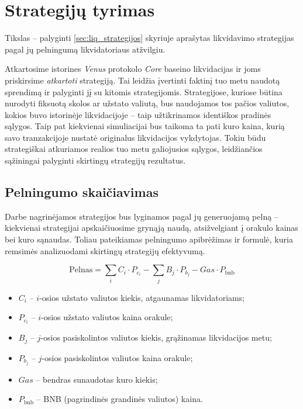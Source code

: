 \documentclass[]{VUMIFTemplateClass}
\begin{document}
\section{Strategijų tyrimas}
Tikslas – palyginti \ref{sec:liq_strategijos} skyriuje aprašytas likvidavimo strategijas pagal jų pelningumą likvidatoriaus atžvilgiu.

Atkartosime istorines \textit{Venus} protokolo \textit{Core} baseino likvidacijas ir joms priskirsime \textit{atkartoti} strategiją. Tai leidžia įvertinti faktinį tuo metu naudotą sprendimą ir palyginti jį su kitomis strategijomis. Strategijose, kuriose būtina nurodyti fiksuotą skolos ar užstato valiutą, bus naudojamos tos pačios valiutos, kokios buvo istorinėje likvidacijoje – taip užtikrinamos identiškos pradinės sąlygos. Taip pat kiekvienai simuliacijai bus taikoma ta pati kuro kaina, kurią savo tranzakcijoje nustatė originalus likvidacijos vykdytojas. Tokiu būdu strategiškai atkuriamos realios tuo metu galiojusios sąlygos, leidžiančios sąžiningai palyginti skirtingų strategijų rezultatus.

\subsection{Pelningumo skaičiavimas}
\label{sec:pelningumo_skaiciavimas}

Darbe nagrinėjamos strategijos bus lyginamos pagal jų generuojamą pelną – kiekvienai strategijai apskaičiuosime grynąją naudą, atsižvelgiant į orakulo kainas bei kuro sąnaudas. Toliau pateikiamas pelningumo apibrėžimas ir formulė, kuria remsimės analizuodami skirtingų strategijų efektyvumą.

\[
\text{Pelnas} = \sum_{i} C_i \cdot P_{c_i} - \sum_{j} B_j \cdot P_{b_j} - Gas \cdot P_\text{bnb}
\]

\begin{itemize}
    \item $C_i$ – $i$-osios užstato valiutos kiekis, atgaunamas likvidatoriams;
    \item $P_{c_i}$ – $i$-osios užstato valiutos kaina orakule;
    \item $B_j$ – $j$-osios pasiskolintos valiutos kiekis, grąžinamas likvidacijos metu;
    \item $P_{b_j}$ – $j$-osios pasiskolintos valiutos kaina orakule;
    \item $Gas$ – bendras sunaudotas kuro kiekis;
    \item $P_\text{bnb}$ – BNB (pagrindinės grandinės valiutos) kaina.
\end{itemize}
\end{document}
